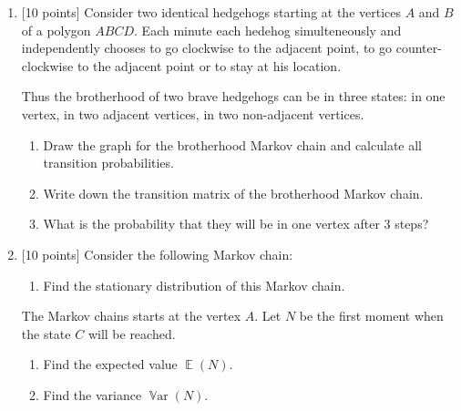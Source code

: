 \documentclass[12pt]{article}
\DeclareMathOperator{\Var}{\mathbb{V}ar}
\DeclareMathOperator{\E}{\mathbb{E}}
\begin{document}
\begin{enumerate}
    \item {[10 points]} Consider two identical hedgehogs starting at the vertices $A$ and $B$ of a polygon $ABCD$. 
    Each minute each hedehog simulteneously and independently chooses to go clockwise to the adjacent point, to go counter-clockwise to the adjacent point or to stay at his location.
    
    Thus the brotherhood of two brave hedgehogs can be in three states: in one vertex, 
    in two adjacent vertices, in two non-adjacent vertices.

  
    \begin{enumerate}
      \item Draw the graph for the brotherhood Markov chain and calculate all transition probabilities. 
      \item Write down the transition matrix of the brotherhood Markov chain. 
      \item What is the probability that they will be in one vertex after 3 steps?
    \end{enumerate}
    
    \item {[10 points]} Consider the following Markov chain:


    \begin{enumerate}
        \item Find the stationary distribution of this Markov chain.
    \end{enumerate}
    
    The Markov chains starts at the vertex $A$.
    Let $N$ be the first moment when the state $C$ will be reached.

    \begin{enumerate}[resume]
      \item Find the expected value $\E(N)$.
      \item Find the variance $\Var(N)$. 
    \end{enumerate}


\end{enumerate}
\end{document}
